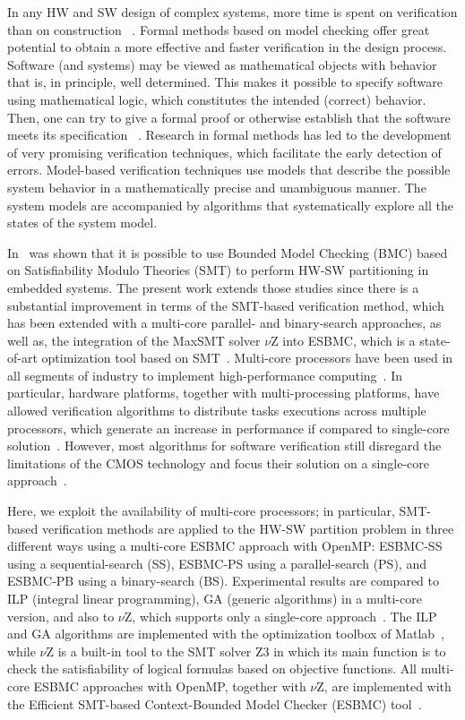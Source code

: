 In any HW and SW design of complex systems, more time is spent on verification than on construction ~\cite{Baier2008}. Formal methods based on model checking offer great potential to obtain a more effective and faster verification in the design process. Software (and systems) may be viewed as mathematical objects with behavior that is, in principle, well determined. This makes it possible to specify software using mathematical logic, which constitutes the intended (correct) behavior. Then, one can try to give a formal proof or otherwise establish that the software meets its specification ~\cite{Clarke2009}. Research in formal methods has led to the development of very promising verification techniques, which facilitate the early detection of errors. Model-based verification techniques use models that describe the possible system behavior in a mathematically precise and unambiguous manner. The system models are accompanied by algorithms that systematically explore all the states of the system model.

In~\cite{Trindade2015,Trindade2016,Trindade2014} was shown that it is possible to use Bounded Model Checking (BMC) based on Satisfiability Modulo Theories (SMT) to perform HW-SW partitioning in embedded systems. The present work extends those studies since there is a substantial improvement in terms of the SMT-based verification method, which has been extended with a multi-core parallel- and binary-search approaches, as well as, the integration of the MaxSMT solver $\nu$Z into ESBMC, which is a state-of-art optimization tool based on SMT~\cite{Bjorner2015}. Multi-core processors have been used in all segments of industry to implement high-performance computing~\cite{Wu2014}. In particular, hardware platforms, together with multi-processing platforms, have allowed verification algorithms to distribute tasks executions across multiple processors, which generate an increase in performance if compared to single-core solution~\cite{Holzmann11}. However, most algorithms for software verification still disregard the limitations of the CMOS technology and focus their solution on a single-core approach~\cite{Cordeiro2012,Clarke2004,Armando2009,Ganai2006}. 

Here, we exploit the availability of multi-core processors; in particular, SMT-based verification methods are applied to the HW-SW partition problem in three different ways using a multi-core ESBMC approach with OpenMP: ESBMC-SS using a sequential-search (SS), ESBMC-PS using a parallel-search (PS), and ESBMC-PB using a binary-search (BS). Experimental results are compared to ILP (integral linear programming), GA (generic algorithms) in a multi-core version, and also to $\nu$Z, which supports only a single-core approach~\cite{Bjorner2015}. The ILP and GA algorithms are implemented with the optimization toolbox of Matlab~\cite{OpenMP1998}, while $\nu$Z is a built-in tool to the SMT solver Z3 in which its main function is to check the satisfiability of logical formulas based on objective functions. All multi-core ESBMC approaches with OpenMP, together with $\nu$Z, are implemented with the Efficient SMT-based Context-Bounded Model Checker (ESBMC) tool~\cite{Cordeiro2012}. 

